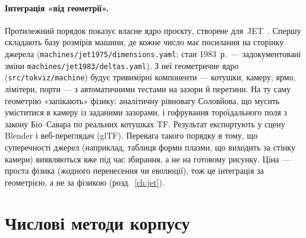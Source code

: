 \paragraph{Інтеграція «від геометрії».} Протилежний порядок показує власне ядро проєкту, створене для~JET~\cite{ProjJET}. Спершу складають базу розмірів машини, де кожне число має посилання на сторінку джерела (\texttt{machines/\allowbreak jet1975/\allowbreak dimensions.yaml}; стан 1983~р.~--- задокументовані зміни \texttt{machines/\allowbreak jet1983/\allowbreak deltas.yaml}). З неї геометричне ядро (\texttt{src/\allowbreak tokviz/\allowbreak machine}) будує тривимірні компоненти --- котушки, камеру, ярмо, лімітери, порти --- з автоматичними тестами на зазори й перетини. На ту саму геометрію «запікають» фізику: аналітичну рівновагу Соловйова, що мусить уміститися в камеру із заданими зазорами, і гофрування тороїдального поля з закону Біо--Савара по реальних котушках TF. Результат експортують у сцену Blender і веб-переглядач (glTF). Перевага такого порядку в тому, що суперечності джерел (наприклад, таблиця форми плазми, що виходить за стінку камери) виявляються вже під час збирання, а не на готовому рисунку. Ціна --- проста фізика (жодного перенесення чи еволюції), тож це інтеграція за геометрією, а не за фізикою (розд.~\ref{ch:jet}).

\section{Числові методи корпусу}\label{sec:11-methods}

